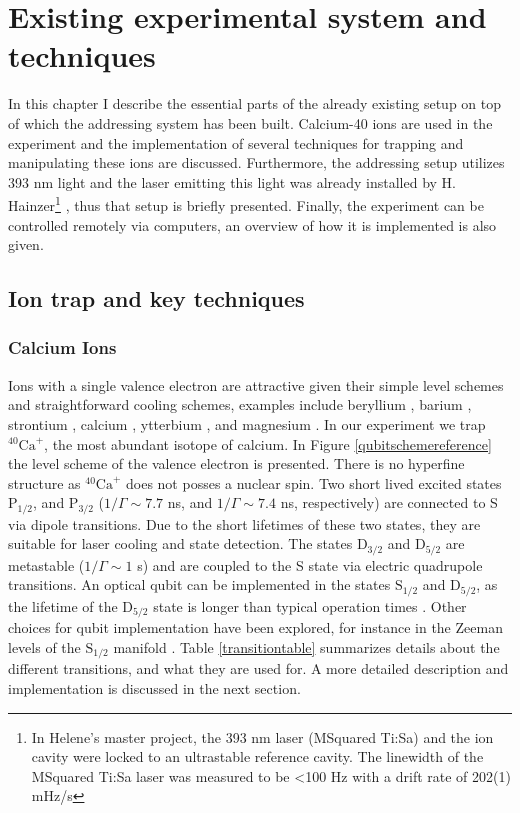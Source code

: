 
\chapter{Existing experimental system and techniques}
In this chapter I describe the essential parts of the already existing setup on top of which the addressing system has been built. Calcium-40 ions are used in the experiment and the implementation of several techniques for trapping and manipulating these ions are discussed. Furthermore, the addressing setup utilizes 393 nm light and the laser emitting this light was already installed by H. Hainzer\footnote{In Helene's master project, the 393 nm laser (MSquared Ti:Sa) and the ion cavity were locked to an ultrastable reference cavity. The linewidth of the MSquared Ti:Sa laser was measured to be <100 Hz with a drift rate of 202(1) mHz/s} \cite{helene}, thus that setup is briefly presented. Finally, the experiment can be controlled remotely via computers, an overview of how it is implemented is also given.

\section{Ion trap and key techniques}
\subsection{Calcium Ions}
\label{sec:calciumion}
Ions with a single valence electron are attractive given their simple level schemes and straightforward cooling schemes, examples include beryllium \cite{beryllium}, barium \cite{barium}, strontium \cite{strontium}, calcium \cite{calcium}, ytterbium \cite{PhysRevA.44.R20}, and magnesium \cite{magnesium}. In our experiment we trap $^{40}\text{Ca}^+$, the most abundant isotope of calcium. In Figure \ref{qubitschemereference} the level scheme of the valence electron is presented. There is no hyperfine structure as $^{40}\text{Ca}^+$ does not posses a nuclear spin. Two short lived excited states $\text{P}_{1/2}$, and $\text{P}_{3/2}$ ($1/\Gamma \sim 7.7$ ns, and $1/\Gamma \sim 7.4$ ns, respectively) are connected to S via dipole transitions. Due to the short lifetimes of these two states, they are suitable for laser cooling and state detection.
 The states $\text{D}_{3/2}$ and $\text{D}_{5/2}$ are metastable ($ 1/\Gamma \sim 1$ s) and are coupled to the S state via electric quadrupole transitions. An optical qubit can be implemented in the states $\text{S}_{1/2}$ and $\text{D}_{5/2}$, as the lifetime of the $\text{D}_{5/2}$ state is longer than typical operation times \cite{calciumqubit}. Other choices for qubit implementation have been explored, for instance in the Zeeman levels of the $\text{S}_{1/2}$ manifold \cite{Ruster2016}. Table \ref{transitiontable} summarizes details about the different transitions, and what they are used for. A more detailed description and implementation is discussed in the next section.

